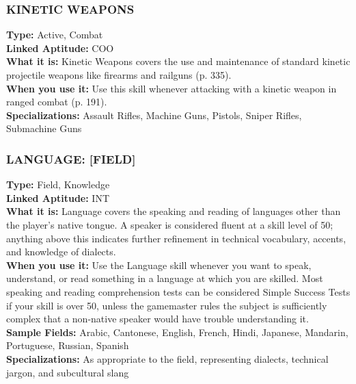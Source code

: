\subsubsection{KINETIC WEAPONS} \textbf{Type:} Active, Combat \\ \textbf{Linked Aptitude:} COO \\ \textbf{What it is:} Kinetic Weapons covers the use and maintenance of standard kinetic projectile weapons like firearms and railguns (p. 335). \\ \textbf{When you use it:} Use this skill whenever attacking with a kinetic weapon in ranged combat (p. 191). \\ \textbf{Specializations:} Assault Rifles, Machine Guns, Pistols, Sniper Rifles, Submachine Guns 



\subsubsection{LANGUAGE: [FIELD]} \textbf{Type:} Field, Knowledge \\ \textbf{Linked Aptitude:} INT \\ \textbf{What it is:} Language covers the speaking and reading of languages other than the player’s native tongue. A speaker is considered fluent at a skill level of 50; anything above this indicates further refinement in technical vocabulary, accents, and knowledge of dialects. \\ \textbf{When you use it:} Use the Language skill whenever you want to speak, understand, or read something in a language at which you are skilled. Most speaking and reading comprehension tests can be considered Simple Success Tests if your skill is over 50, unless the gamemaster rules the subject is sufficiently complex that a non-native speaker would have trouble understanding it. \\ \textbf{Sample Fields:} Arabic, Cantonese, English, French, Hindi, Japanese, Mandarin, Portuguese, Russian, Spanish \\ \textbf{Specializations:} As appropriate to the field, representing dialects, technical jargon, and subcultural slang 

